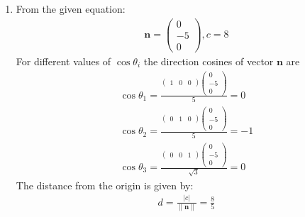 \documentclass[12pt]{article}
\providecommand{\norm}[1]{\left\lVert#1\right\rVert}
\newcommand{\myvec}[1]{\ensuremath{\begin{pmatrix}#1\end{pmatrix}}}
\let\vec\mathbf
\begin{document}
\begin{enumerate}
\item From the given equation:
         \begin{align}
		\vec{n}=\myvec{0\\-5\\0},c=8
			\end{align}
	For different values of $\cos\theta_i$ the direction cosines of vector $\vec{n}$ are
		\begin{align}
		\cos\theta_1=\frac{\myvec{1&0&0}\myvec{0 \\ -5\\0}}{5}=0\\
			\cos\theta_2=\frac{\myvec{0&1&0}\myvec{0 \\ -5\\0}}{5}=-1\\
			\cos\theta_3=\frac{\myvec{0&0&1}\myvec{0\\-5\\0}}{\sqrt{3}}=0
		\end{align}
	The distance from the origin is given by:
		\begin{align}
			d=\frac{|c|}{\norm{\vec{n}}}=\frac{8}{5}
		\end{align}

\end{enumerate}
\end{document}
